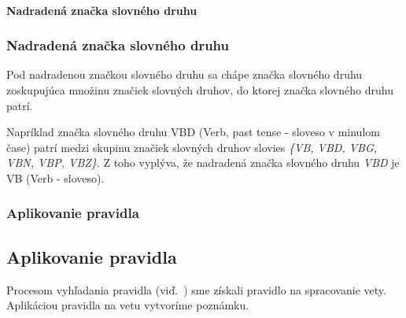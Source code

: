 %
%
{
	\paragraph{Nadradená značka slovného druhu}
}
{
	\subsubsection{Nadradená značka slovného druhu}
}
\label{paragraph:superior_pos_tag}

Pod nadradenou značkou slovného druhu sa chápe značka slovného druhu zoskupujúca množinu značiek slovných druhov, do ktorej značka slovného druhu patrí. 

Napríklad značka slovného druhu VBD (Verb, past tense - sloveso v minulom čase) patrí medzi skupinu značiek slovných druhov slovies \textit{\{VB, VBD, VBG, VBN, VBP, VBZ\}}. Z toho vyplýva, že nadradená značka slovného druhu \textit{VBD} je VB (Verb - sloveso).

%
%
{
	\subsubsection{Aplikovanie pravidla}
}
{
	\subsection{Aplikovanie pravidla}
}
\label{subsubsection:rule_application}

Procesom vyhľadania pravidla (viď.~) sme získali pravidlo na spracovanie vety. Aplikáciou pravidla na vetu vytvoríme poznámku.

